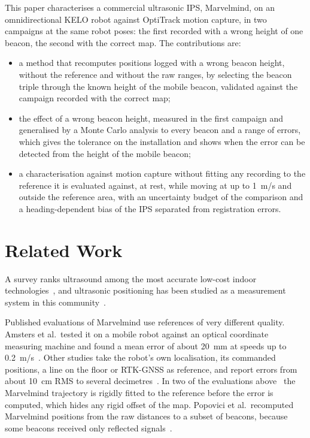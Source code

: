 \documentclass[conference]{IEEEtran}
\begin{document}
This paper characterises a commercial ultrasonic IPS, Marvelmind, on an omnidirectional KELO robot
against OptiTrack motion capture, in two campaigns at the same robot poses: the first recorded with a
wrong height of one beacon, the second with the correct map. The contributions are:
\begin{itemize}
  \item a method that recomputes positions logged with a wrong beacon height, without the reference and
        without the raw ranges, by selecting the beacon triple through the known height of the mobile
        beacon, validated against the campaign recorded with the correct map;
  \item the effect of a wrong beacon height, measured in the first campaign and generalised by a Monte
        Carlo analysis to every beacon and a range of errors, which gives the tolerance on the
        installation and shows when the error can be detected from the height of the mobile beacon;
  \item a characterisation against motion capture without fitting any recording to the reference it is
        evaluated against, at rest, while moving at up to \SI{1}{m/s} and outside the reference area,
        with an uncertainty budget of the comparison and a heading-dependent bias of the IPS separated
        from registration errors.
\end{itemize}

\section{Related Work}
A survey ranks ultrasound among the most accurate low-cost indoor
technologies~\cite{zafari2019survey}, and ultrasonic positioning has been studied as a measurement
system in this community~\cite{carotenuto2019indoor,comuniello2020ultrasound}.

Published evaluations of Marvelmind use references of very different quality. Amsters et al.\ tested it
on a mobile robot against an optical coordinate measuring machine and found a mean error of about
\SI{20}{mm} at speeds up to \SI{0.2}{m/s}~\cite{amsters2019evaluation}. Other studies take the robot's
own localisation, its commanded positions, a line on the floor or RTK-GNSS as reference, and report
errors from about \SI{10}{cm} RMS to several
decimetres~\cite{wang2026performance,exposito2019evaluation}. In two of the evaluations
above~\cite{amsters2019evaluation,wang2026performance} the Marvelmind trajectory is rigidly fitted to
the reference before the error is computed, which hides any rigid offset of the map. Popovici et al.\ recomputed Marvelmind positions from the raw
distances to a subset of beacons, because some beacons received only reflected signals~\cite{popovici2022kinematics}.
\end{document}
